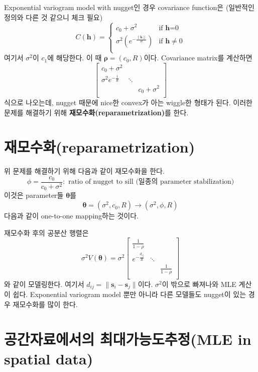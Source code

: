 \documentclass[b5paper,]{scrbook}
\theoremstyle{plain}
\theoremstyle{definition}
\numberwithin{equation}{section}
\begin{document}
Exponential variogram model with nugget인 경우 covariance function은 (일반적인 정의와 다른 것 같으니 체크 필요)
\[
C(\mathbf{h})=
\begin{cases}
c_{0}+\sigma^{2} & \text{if $\mathbf{h}$=0}\\
\sigma^{2}(e^{-\frac{\|\mathbf{h}\|}{R}}) & \text{if $\mathbf{h}\neq 0$}\\
\end{cases}
\]
여기서 \(\sigma^{2}\)이 \(c_{1}\)에 해당한다. 이 때 \(\boldsymbol{\rho}=(c_{0},R)\)이다. Covariance matrix를 계산하면
\[
\begin{bmatrix}
c_{0}+\sigma^{2} &  &  \\
\sigma^{2}e^{-\frac{1}{R}} & \ddots &  \\
 &  & c_{0}+\sigma^{2}\\
\end{bmatrix}
\]
식으로 나오는데, nugget 때문에 nice한 convex가 아는 wiggle한 형태가 된다. 이러한 문제를 해결하기 위해 \textbf{재모수화(reparametrization)}를 한다.

\hypertarget{reparametrization}{%
\section{재모수화(reparametrization)}\label{reparametrization}}

위 문제를 해결하기 위해 다음과 같이 재모수화을 한다.
\[\phi=\frac{c_{0}}{c_{0}+\sigma^{2}}: \text{ ratio of nugget to sill (일종의 parameter stabilization)}\]
이것은 parameter들 \(\boldsymbol{\theta}\)를
\[\boldsymbol{\theta}=(\sigma^{2}, c_{0}, R) \rightarrow (\sigma^{2}, \phi , R)\]
다음과 같이 one-to-one mapping하는 것이다.

재모수화 후의 공분산 행렬은
\[
\sigma^{2}V(\boldsymbol{\theta}) = \sigma^{2} 
\begin{bmatrix}
\frac{1}{1-\rho} &  &  \\
e^{-\frac{d_{ij}}{R}} & \ddots &  \\
 &  & \frac{1}{1-\rho}\\
\end{bmatrix}
\]
와 같이 모델링한다. 여기서 \(d_{ij}=\|\mathbf{s}_{i}-\mathbf{s}_{j}\|\)이다. \(\sigma^{2}\)이 밖으로 빠져나와 MLE 계산이 쉽다. Exponential variogram model 뿐만 아니라 다른 모델들도 nugget이 있는 경우 재모수화를 많이 한다.

\hypertarget{-mle-in-spatial-data}{%
\section{공간자료에서의 최대가능도추정(MLE in spatial data)}\label{-mle-in-spatial-data}}
\end{document}
